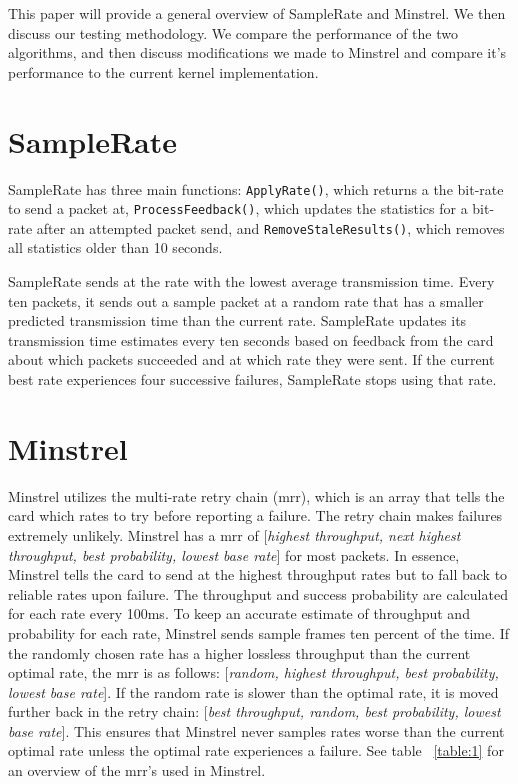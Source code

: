 \documentclass[twocolumn,10pt]{article}
\begin{document}
This paper will provide a general overview of SampleRate and
Minstrel.  We then discuss our testing methodology.  We compare the
performance of the two algorithms, and then discuss modifications we
made to Minstrel and compare it's performance to the current kernel
implementation.


\section{SampleRate}

SampleRate has three main functions: \texttt{ApplyRate()}, which
returns a the bit-rate to send a packet at,
\texttt{ProcessFeedback()}, which updates the statistics for a bit-rate
after an attempted packet send, and \texttt{RemoveStaleResults()},
which removes all statistics older than 10 seconds.

SampleRate sends at the rate with the lowest average transmission
time.  Every ten packets, it sends out a sample packet at a random rate
that has a smaller predicted transmission time than the current
rate.  SampleRate updates its transmission time estimates every ten
seconds based on feedback from the card about which packets succeeded
and at which rate they were sent.  If the current best rate experiences
four successive failures, SampleRate stops using that rate.


\section{Minstrel}

Minstrel utilizes the multi-rate retry chain (mrr), which is an array
that tells the card which rates to try before reporting a failure.  The
retry chain makes failures extremely unlikely.  Minstrel has a mrr of
[\emph{highest throughput, next highest throughput, best probability,
    lowest base rate}] for most packets.  In essence, Minstrel tells
the card to send at the highest throughput rates but to fall back to
reliable rates upon failure.  The throughput and success probability
are calculated for each rate every 100ms.  To keep an accurate
estimate of throughput and probability for each rate, Minstrel sends
sample frames ten percent of the time.  If the randomly chosen rate has
a higher lossless throughput than the current optimal rate, the mrr is
as follows: [\emph{random, highest throughput, best probability,
    lowest base rate}].  If the random rate is slower than the optimal
rate, it is moved further back in the retry chain: [\emph{best
    throughput, random, best probability, lowest base rate}].  This
ensures that Minstrel never samples rates worse than the current
optimal rate unless the optimal rate experiences a failure.  See table
~\ref{table:1} for an overview of the mrr's used in Minstrel.
\end{document}
